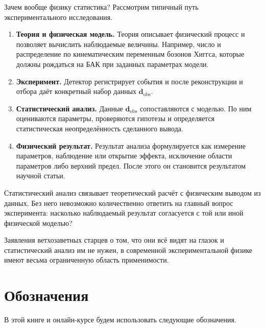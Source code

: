\documentclass[
  russian,
  11pt,
  a4paper,
  open=any]{scrbook}
\begin{document}
Зачем вообще физику статистика? Рассмотрим типичный путь
экспериментального исследования.

\begin{enumerate}
\def\labelenumi{\arabic{enumi}.}
\item
  \textbf{Теория и физическая модель.} Теория описывает физический
  процесс и позволяет вычислить наблюдаемые величины. Например, число и
  распределение по кинематическим переменным бозонов Хиггса, которые
  должны рождаться на БАК при заданных параметрах модели.
\item
  \textbf{Эксперимент.} Детектор регистрирует события и после
  реконструкции и отбора даёт конкретный набор данных
  \(\mathbf d_{\mathrm{obs}}\).
\item
  \textbf{Статистический анализ.} Данные \(\mathbf d_{\mathrm{obs}}\)
  сопоставляются с моделью. По ним оцениваются параметры, проверяются
  гипотезы и определяется статистическая неопределённость сделанного
  вывода.
\item
  \textbf{Физический результат.} Результат анализа формулируется как
  измерение параметров, наблюдение или открытие эффекта, исключение
  области параметров либо верхний предел. После этого он становится
  результатом научной статьи.
\end{enumerate}

\begin{booknote}

Статистический анализ связывает теоретический расчёт с физическим
выводом из данных. Без него невозможно количественно ответить на главный
вопрос эксперимента: насколько наблюдаемый результат согласуется с той
или иной физической моделью?

Заявления ветхозаветных старцев о том, что они всё видят на глазок и
статистический анализ им не нужен, в современной экспериментальной
физике имеют весьма ограниченную область применимости.

\end{booknote}

\section{Обозначения}\label{ux43eux431ux43eux437ux43dux430ux447ux435ux43dux438ux44f}

В этой книге и онлайн-курсе будем использовать следующие обозначения.
\end{document}
